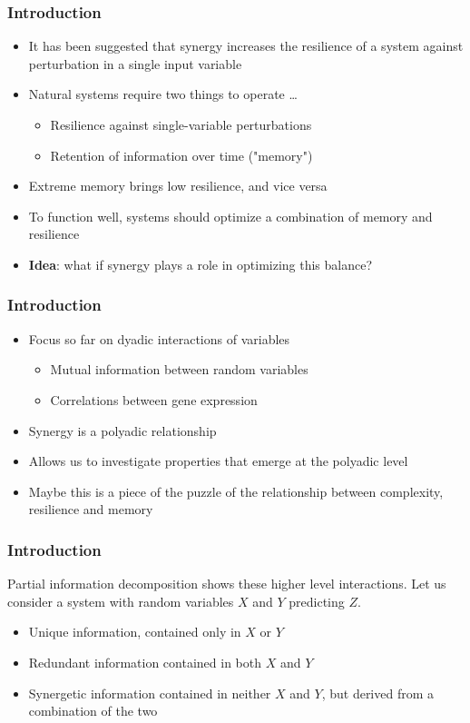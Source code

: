 \documentclass[hyperref={pdfpagelabels=false}]{beamer}
\begin{document}
\begin{frame}
\frametitle{Introduction}
\begin{itemize}
\item It has been suggested that synergy increases the resilience of a system against perturbation in a single input variable \cite{quax2017quantifying}
\item Natural systems require two things to operate \dots{}
\begin{itemize}
\item Resilience against single-variable perturbations
\item Retention of information over time ("memory")
\end{itemize}
\item Extreme memory brings low resilience, and vice versa
\item To function well, systems should optimize a combination of memory and resilience
\item \textbf{Idea}: what if synergy plays a role in optimizing this balance?
\end{itemize}
\end{frame}

\begin{frame}
\frametitle{Introduction}
\begin{itemize}
\item Focus so far on dyadic interactions of variables \cite{ideker2001integrated, lu2004gene, tononi1999measures}
\begin{itemize}
\item Mutual information between random variables
\item Correlations between gene expression
\end{itemize}
\item Synergy is a polyadic relationship
\item Allows us to investigate properties that emerge at the polyadic level
\item Maybe this is a piece of the puzzle of the relationship between complexity, resilience and memory
\end{itemize}
\end{frame}

\begin{frame}
\frametitle{Introduction}
Partial information decomposition shows these higher level interactions.
Let us consider a system with random variables $X$ and $Y$ predicting $Z$.
\begin{itemize}
\item Unique information, contained only in $X$ or $Y$
\item Redundant information contained in both $X$ and $Y$
\item Synergetic information contained in neither $X$ and $Y$, but derived from a combination of the two
\end{itemize}
\end{frame}
\end{document}
